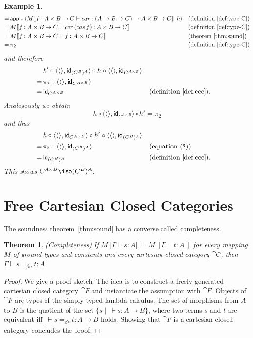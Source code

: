 \documentclass{article}
\newtheorem{exmpl}[defn]{Example}
\newtheorem{theorem}[defn]{Theorem}
\newcommand{\type}{\vdash}
\newcommand{\id}{\mathsf{id}}
\begin{document}
\begin{exmpl}
\begin{align*}
        = \,& \mathsf{app} \circ \langle M|[f: A \times B \to C \vdash car: (A \to B \to C) \to A \times B \to C|] , h \rangle && (\text{definition}~\ref{def:type-C})\\
        = \,& M|[f: A \times B \to C \vdash car\,(cas \,f): A \times B \to C|] && (\text{definition}~\ref{def:type-C}) \\
        = \,& M|[f: A \times B \to C \vdash f: A \times B \to C|] && (\text{theorem}~\ref{thm:sound})\\
        = \,& \pi_2 && (\text{definition}~\ref{def:type-C})
    \end{align*}
    and therefore
    \begin{align*}
        & h' \circ \langle\langle\rangle, \id_{(C^B)^A}\rangle \circ h \circ \langle \langle\rangle, \id_{C^{A \times B}} \rangle \\
        =\, & \pi_2 \circ \langle \langle\rangle, \id_{C^{A \times B}} \rangle \\
        =\, & \id_{C^{A \times B}} && (\text{definition}~\ref{def:ccc}).
    \end{align*}
    Analogously we obtain
    \[ h \circ \langle \langle\rangle, \id_{C^{A \times B}} \rangle \circ h' = \pi_2 \tag{2} \]
    and thus
    \begin{align*}
        & h \circ \langle \langle\rangle, \id_{C^{A \times B}} \rangle \circ h' \circ \langle\langle\rangle, \id_{(C^B)^A}\rangle \\
        =\, & \pi_2 \circ \langle\langle\rangle, \id_{(C^B)^A}\rangle && (\text{equation}~(2))\\
        =\, & \id_{(C^B)^A} && (\text{definition}~\ref{def:ccc}).
    \end{align*}
    This shows $C^{A \times B} \iso (C^B)^A$.
\end{exmpl}


\section{Free Cartesian Closed Categories}
\label{sec:free}

The soundness theorem~\ref{thm:sound} has a converse called completeness.

\begin{theorem}{(Completeness)}
    \label{thm:compl}
    If $M|[\Gamma\type s: A|] = M|[\Gamma\type t: A|]$ for every mapping $M$ of ground types and constants and every cartesian closed category $\cat{C}$,
    then $\Gamma \type s =_{\beta\eta} t: A$.
\end{theorem}
\begin{proof}
    We give a proof sketch.
    The idea is to construct a freely generated cartesian closed category $\cat{F}$ and instantiate the assumption with $\cat{F}$.
    Objects of $\cat{F}$ are types of the simply typed lambda calculus.
    The set of morphisms from $A$ to  $B$ is the quotient of the set $\{s \mid \ \type s: A \to B\}$, where two terms $s$ and $t$ are equivalent iff
    $\ \type s =_{\beta\eta} t: A \to B$ holds.
    Showing that $\cat{F}$ is a cartesian closed category concludes the proof.
\end{proof}


\nocite{*}


\end{document}
